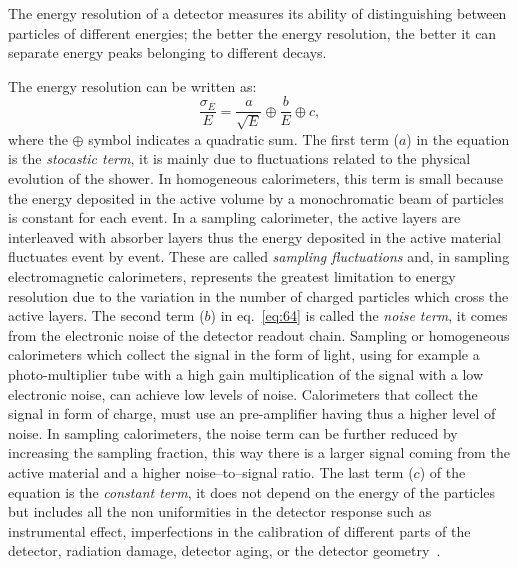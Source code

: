 The energy resolution of a detector measures its ability of distinguishing
between particles of different energies; the better the energy resolution, the
better it can separate energy peaks belonging to different decays.

The energy resolution can be written as:
\begin{equation}
  \label{eq:64}
  \frac{\sigma_E}{E} = \frac{a}{\sqrt{E}} \oplus \frac{b}{E} \oplus c,
\end{equation}
where the $\oplus$ symbol indicates a quadratic sum. The first term ($a$) in the
equation is the \emph{stocastic term}, it is mainly due to fluctuations related
to the physical evolution of the shower. In homogeneous calorimeters, this term
is small because the energy deposited in the active volume by a monochromatic
beam of particles is constant for each event. In a sampling calorimeter, the
active layers are interleaved with absorber layers thus the energy deposited in
the active material fluctuates event by event. These are called \emph{sampling
  fluctuations} and, in sampling electromagnetic calorimeters, represents the
greatest limitation to energy resolution due to the variation in the number of
charged particles which cross the active layers. The second term ($b$) in
eq.~\eqref{eq:64} is called the \emph{noise term}, it comes from the electronic
noise of the detector readout chain. Sampling or homogeneous calorimeters which
collect the signal in the form of light, using for example a photo-multiplier
tube with a high gain multiplication of the signal with a low electronic noise,
can achieve low levels of noise. Calorimeters that collect the signal in form of
charge, must use an pre-amplifier having thus a higher level of noise. In
sampling calorimeters, the noise term can be further reduced by increasing the
sampling fraction, this way there is a larger signal coming from the active
material and a higher noise--to--signal ratio. The last term ($c$) of the
equation is the \emph{constant term}, it does not depend on the energy of the
particles but includes all the non uniformities in the detector response such as
instrumental effect, imperfections in the calibration of different parts of the
detector, radiation damage, detector aging, or the detector
geometry~\cite{Calorimetry}.

